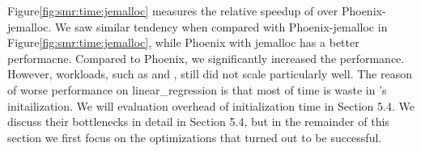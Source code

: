 Figure\ref{fig:smr:time:jemalloc} measures the relative speedup of \myds over Phoenix-jemalloc. 
We saw similar tendency when compared with Phoenix-jemalloc in Figure\ref{fig:smr:time:jemalloc}, while Phoenix with jemalloc has a better performacne.
Compared to Phoenix, we significantly increased the performance.
However, workloads, such as  and , still did not scale particularly well. 
The reason of worse performance on linear\_regression is that most of time is waste in \myds's initailization.
We will evaluation overhead of initialization time in Section 5.4.
We discuss their bottlenecks in detail in Section 5.4, but in the remainder of this section we first focus on the optimizations that turned out to be successful.




%





